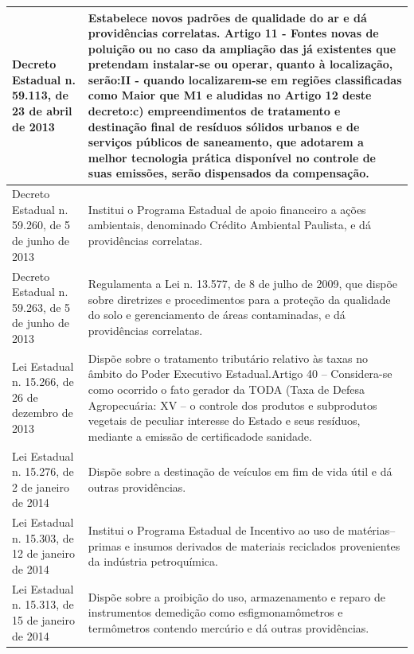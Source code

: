 \begin{center}
\begin{longtable}{|p{}|p{}|}
			\hline
			Decreto Estadual n. 59.113, de 23 de abril de 2013 & Estabelece novos padrões de qualidade do ar e dá providências correlatas. Artigo 11 - Fontes novas de poluição ou no caso da ampliação das já existentes que pretendam instalar-se ou operar, quanto à localização, serão:\newline{}II  -  quando  localizarem-se  em  regiões  classificadas  como  Maior  que  M1  e aludidas no Artigo 12 deste decreto:\newline{}c)  empreendimentos  de  tratamento  e  destinação  final  de  resíduos  sólidos urbanos  e   de   serviços  públicos   de   saneamento,  que  adotarem  a  melhor tecnologia prática disponível no controle de suas emissões, serão dispensados da compensação. \\
			\hline
			Decreto Estadual n. 59.260, de 5 de junho de 2013 & Institui   o   Programa   Estadual   de   apoio   financeiro   a   ações   ambientais, denominado Crédito Ambiental Paulista, e dá providências correlatas. \\
			\hline
			Decreto Estadual n. 59.263, de 5 de junho de 2013 & Regulamenta a Lei n. 13.577, de 8 de julho de 2009, que dispõe sobre diretrizes e  procedimentos  para  a  proteção  da  qualidade  do  solo  e  gerenciamento  de áreas contaminadas, e dá providências correlatas. \\
			\hline
			Lei  Estadual  n.  15.266,  de  26 de dezembro de 2013 & Dispõe  sobre  o  tratamento  tributário  relativo  às  taxas  no  âmbito  do  Poder Executivo Estadual.\newline{}Artigo  40  –  Considera-se  como  ocorrido  o  fato  gerador  da  TODA  (Taxa  de Defesa Agropecuária: XV – o controle dos produtos e subprodutos vegetais de peculiar interesse do Estado e seus resíduos, mediante a emissão de certificado\newline{}de sanidade. \\
			\hline
			Lei Estadual n. 15.276, de 2 de janeiro de 2014 & Dispõe  sobre  a  destinação  de  veículos  em  fim  de  vida  útil  e  dá  outras providências. \\
			\hline
			Lei  Estadual  n.  15.303,  de  12 de janeiro de 2014 & Institui o Programa Estadual de Incentivo ao uso de matérias–primas e insumos derivados de materiais reciclados provenientes da indústria petroquímica. \\
			\hline
			Lei  Estadual  n.  15.313,  de  15 de janeiro de 2014 & Dispõe sobre a proibição do uso, armazenamento e reparo de instrumentos de\newline{}medição  como  esfigmonamômetros  e  termômetros  contendo  mercúrio  e  dá outras providências. \\

\end{longtable}
\end{center}
